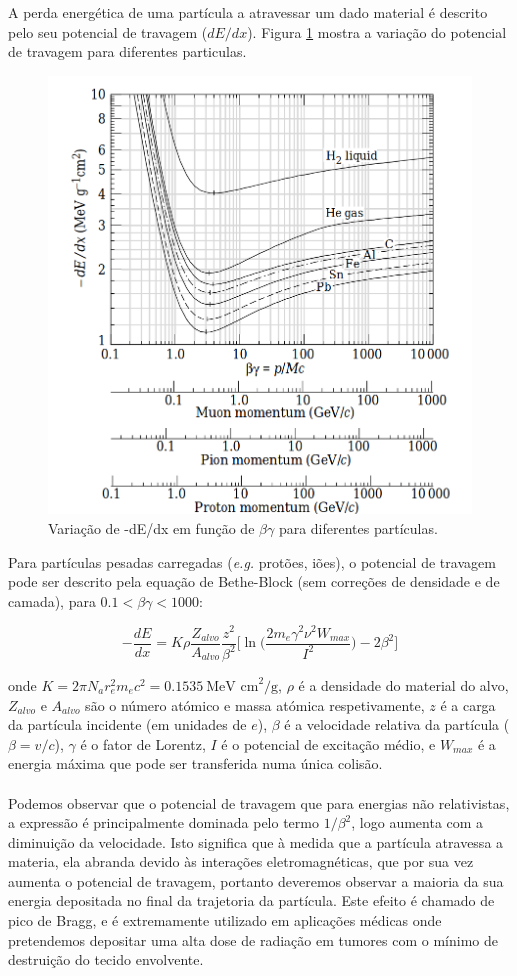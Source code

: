 \documentclass[a4paper, 12pt]{article} %
\begin{document}
	A perda energética de uma partícula a atravessar um dado material é descrito pelo seu potencial de travagem ($dE/dx$). Figura \ref{fig:bethe} mostra a variação do potencial de travagem para diferentes particulas. 

	\begin{figure}[H]
		\centering
		\includegraphics[width=0.5\linewidth]{bethe_bloch.png}
		\caption{Variação de -dE/dx em função de $\beta\gamma$ para diferentes partículas.}
		\label{fig:bethe}
	\end{figure}

	Para partículas pesadas carregadas (\textit{e.g.} protões, iões), o potencial de travagem pode ser descrito pela equação de Bethe-Block (sem correções de densidade e de camada), para $0.1 < \beta\gamma < 1000 $:

	\begin{equation}
		-\frac{dE}{dx} = K \rho \frac{Z_{alvo}}{A_{alvo}} \frac{z^2}{\beta^2}\Bigg[ \ln \Big(\frac{2 m_e \gamma^2 \nu^2 W_{max}}{I^2}\Big) - 2\beta^2 \Bigg]
		\label{eq:bethe_block}
	\end{equation}

	onde $K = 2\pi N_a r_e^2 m_e c^2 = 0.1535\ \text{MeV cm}^2/\text{g}$, $\rho$ é a densidade do material do alvo, $Z_{alvo}$ e $A_{alvo}$ são o número atómico e massa atómica respetivamente, $z$ é a carga da partícula incidente (em unidades de $e$), $\beta$ é a velocidade relativa da partícula ($\beta=v/c$), $\gamma$ é o fator de Lorentz, $I$ é o potencial de excitação médio, e $W_{max}$ é a energia máxima que pode ser transferida numa única colisão.

	\paragraph{} Podemos observar que o potencial de travagem que para energias não relativistas, a expressão é principalmente dominada pelo termo $1/\beta^2$, logo aumenta com a diminuição da velocidade. Isto significa que à medida que a partícula atravessa a materia, ela abranda devido às interações eletromagnéticas, que por sua vez aumenta o potencial de travagem, portanto deveremos observar a maioria da sua energia depositada no final da trajetoria da partícula. Este efeito é chamado de pico de Bragg, e é extremamente utilizado em aplicações médicas onde pretendemos depositar uma alta dose de radiação em tumores com o mínimo de destruição do tecido envolvente.
\end{document}
